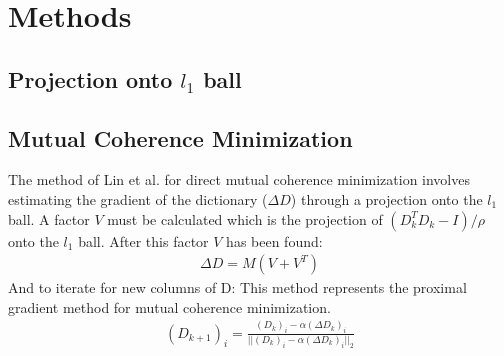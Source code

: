 \documentclass[journal]{IEEEtran}
\begin{document}
\section{Methods}
\subsection{Projection onto $l_1$ ball}
\subsection{Mutual Coherence Minimization}
The method of Lin et al. for direct mutual coherence minimization involves estimating the gradient of the dictionary
($\Delta D$) through a projection onto the $l_1$ ball. A factor $V$ must be calculated which is
the projection of $(D_k^T D_k - I)/ \rho $ onto the $l_1$ ball.
After this factor $V$ has been found:
\begin{align}
    \Delta D = M(V + V^T)
\end{align}
And to iterate for new columns of D:
This method represents the proximal gradient method for mutual coherence minimization.
\begin{align}
    (D_{k+1})_i = \frac{(D_k)_i - \alpha (\Delta D_k)_i}{||(D_k)_i - \alpha (\Delta D_k)_i||_2}
\end{align}
\end{document}

